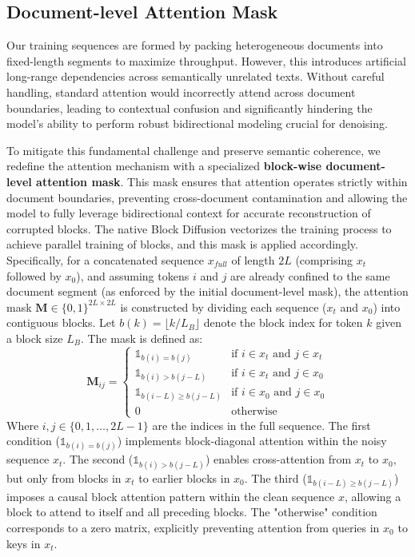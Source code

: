 \subsection{Document-level Attention Mask}
Our training sequences are formed by packing heterogeneous documents into fixed-length segments to maximize throughput. However, this introduces artificial long-range dependencies across semantically unrelated texts. Without careful handling, standard attention would incorrectly attend across document boundaries, leading to contextual confusion and significantly hindering the model's ability to perform robust bidirectional modeling crucial for denoising.

To mitigate this fundamental challenge and preserve semantic coherence, we redefine the attention mechanism with a specialized \textbf{block-wise document-level attention mask}. This mask ensures that attention operates strictly within document boundaries, preventing cross-document contamination and allowing the model to fully leverage bidirectional context for accurate reconstruction of corrupted blocks. The native Block Diffusion vectorizes the training process to achieve parallel training of blocks, and this mask is applied accordingly.
Specifically, for a concatenated sequence $x_{full}$ of length $2L$ (comprising $x_t$ followed by $x_0$), and assuming tokens $i$ and $j$ are already confined to the same document segment (as enforced by the initial document-level mask), the attention mask $\bm{M}\in\{0,1\}^{2L\times 2L}$ is constructed by dividing each sequence ($x_t$ and $x_0$) into contiguous blocks. Let $b(k) = \lfloor k / L_B \rfloor$ denote the block index for token $k$ given a block size $L_B$. The mask is defined as:
\begin{equation}
\bm{M}_{ij} =
\begin{cases}
    \mathbb{1}_{b(i) = b(j)} & \text{if } i \in x_t \text{ and } j \in x_t \\
    \mathbb{1}_{b(i) > b(j-L)} & \text{if } i \in x_t \text{ and } j \in x_0 \\
    \mathbb{1}_{b(i-L) \ge b(j-L)} & \text{if } i \in x_0 \text{ and } j \in x_0 \\
    0 & \text{otherwise}
\end{cases}
\end{equation}
Where $i, j \in \{0, 1, \dots, 2L-1\}$ are the indices in the full sequence. The first condition ($\mathbb{1}_{b(i) = b(j)}$) implements block-diagonal attention within the noisy sequence $x_t$. The second ($\mathbb{1}_{b(i) > b(j-L)}$) enables cross-attention from $x_t$ to $x_0$, but only from blocks in $x_t$ to earlier blocks in $x_0$. The third ($\mathbb{1}_{b(i-L) \ge b(j-L)}$) imposes a causal block attention pattern within the clean sequence $x$, allowing a block to attend to itself and all preceding blocks. The "otherwise" condition corresponds to a zero matrix, explicitly preventing attention from queries in $x_0$ to keys in $x_t$. 

